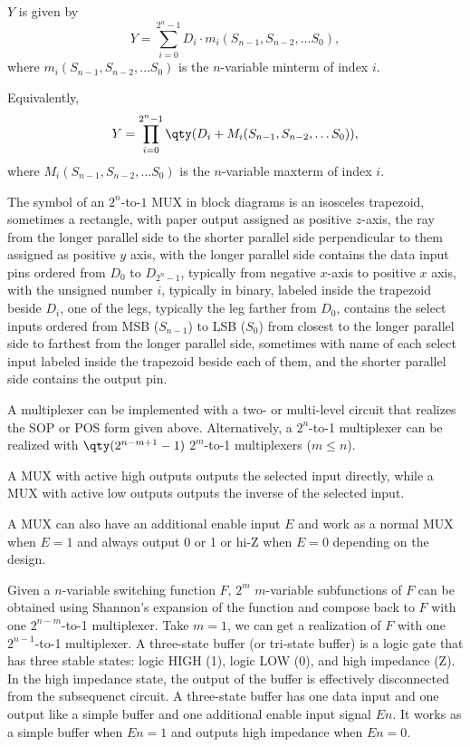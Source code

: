 \documentclass[a4paper,12pt]{report}
\begin{document}
$Y$ is given by
\[Y=\sum_{i=0}^{2^n-1}D_i\cdot m_i(S_{n-1},S_{n-2},\ldots S_0),\]
where $m_i(S_{n-1},S_{n-2},\ldots S_0)$ is the $n$-variable minterm of index $i$.

Equivalently,
\[Y=\prod_{i=0}^{2^n-1}\qty(D_i+M_i(S_{n-1},S_{n-2},\ldots S_0)),\]
where $M_i(S_{n-1},S_{n-2},\ldots S_0)$ is the $n$-variable maxterm of index $i$.

The symbol of an $2^n$-to-$1$ MUX in block diagrams is an isosceles trapezoid, sometimes a rectangle, with paper output assigned as positive $z$-axis, the ray from the longer parallel side to the shorter parallel side perpendicular to them assigned as positive $y$ axis, with the longer parallel side contains the data input pins ordered from $D_0$ to $D_{2^n-1}$, typically from negative $x$-axis to positive $x$ axis, with the unsigned number $i$, typically in binary, labeled inside the trapezoid beside $D_i$, one of the legs, typically the leg farther from $D_0$, contains the select inputs ordered from MSB ($S_{n-1}$) to LSB ($S_0$) from closest to the longer parallel side to farthest from the longer parallel side, sometimes with name of each select input labeled inside the trapezoid beside each of them, and the shorter parallel side contains the output pin.

A multiplexer can be implemented with a two- or multi-level circuit that realizes the SOP or POS form given above. Alternatively, a $2^n$-to-1 multiplexer can be realized with $\qty(2^{n-m+1}-1)$ $2^m$-to-1 multiplexers ($m\leq n$).

A MUX with active high outputs outputs the selected input directly, while a MUX with active low outputs outputs the inverse of the selected input.

A MUX can also have an additional enable input $E$ and work as a normal MUX when $E=1$ and always output 0 or 1 or hi-Z when $E=0$ depending on the design.

Given a $n$-variable switching function $F$, $2^m$ $m$-variable subfunctions of $F$ can be obtained using Shannon's expansion of the function and compose back to $F$ with one $2^{n-m}$-to-1 multiplexer. Take $m=1$, we can get a realization of $F$ with one $2^{n-1}$-to-1 multiplexer.
A three-state buffer (or tri-state buffer) is a logic gate that has three stable states: logic HIGH (1), logic LOW (0), and high impedance (Z). In the high impedance state, the output of the buffer is effectively disconnected from the subsequenct circuit. A three-state buffer has one data input and one output like a simple buffer and one additional enable input signal $En$. It works as a simple buffer when $En=1$ and outputs high impedance when $En=0$.
\end{document}
